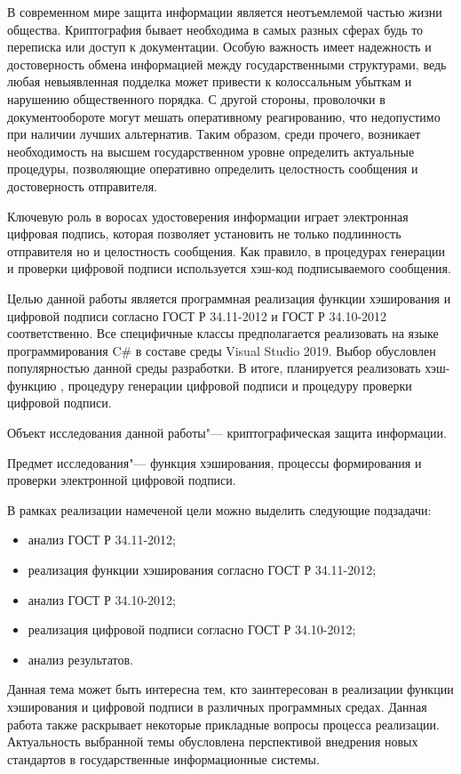 \Introduction

\par
В современном мире защита информации является неотъемлемой частью жизни общества. Криптография бывает необходима в самых разных сферах будь то переписка или доступ к документации. Особую важность имеет надежность и достоверность обмена информацией между государственными структурами, ведь любая невыявленная подделка может привести к колоссальным убыткам и нарушению общественного порядка. С другой стороны, проволочки в документообороте могут мешать оперативному реагированию, что недопустимо при наличии лучших альтернатив. Таким образом, среди прочего, возникает необходимость на высшем государственном уровне определить актуальные процедуры, позволяющие оперативно определить целостность сообщения и достоверность отправителя.
\par
Ключевую роль в воросах удостоверения информации играет электронная цифровая подпись, которая позволяет установить не только подлинность отправителя но и целостность сообщения. Как правило, в процедурах генерации и проверки цифровой подписи используется хэш-код подписываемого сообщения.
\par
Целью данной работы является программная реализация функции хэширования и цифровой подписи согласно ГОСТ Р 34.11-2012 и ГОСТ Р 34.10-2012 соответственно. Все специфичные классы предполагается реализовать на языке программирования C\# в составе среды Visual Studio 2019. Выбор обусловлен популярностью данной среды разработки. В итоге, планируется реализовать хэш-функцию , процедуру генерации цифровой подписи и процедуру проверки цифровой подписи.
\par
Объект исследования данной работы"--- криптографическая защита информации.
\par
Предмет исследования"--- функция хэширования, процессы формирования и проверки электронной цифровой подписи.
\par
В рамках реализации намеченой цели можно выделить следующие подзадачи:
\begin{itemize}
	\item анализ ГОСТ Р 34.11-2012;
	\item реализация функции хэширования согласно ГОСТ Р 34.11-2012;
	\item анализ ГОСТ Р 34.10-2012;
	\item реализация цифровой подписи согласно ГОСТ Р 34.10-2012;
	\item анализ результатов.
\end{itemize}
\par
Данная тема может быть интересна тем, кто заинтересован в реализации функции хэширования и цифровой подписи в различных программных средах. Данная работа также раскрывает некоторые прикладные вопросы процесса реализации. Актуальность выбранной темы обусловлена перспективой внедрения новых стандартов в государственные информационные системы.
